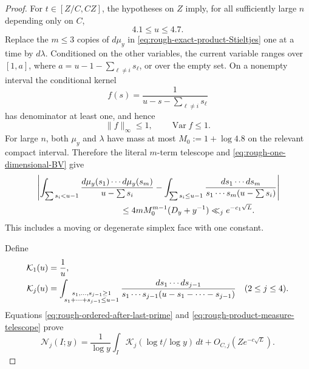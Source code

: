 \documentclass[11pt]{article}
\numberwithin{equation}{section}
\theoremstyle{definition}
\theoremstyle{remark}
\newcommand{\1}{\mathbf 1}
\begin{document}
\begin{proof}
For \(t\in[Z/C,CZ]\), the hypotheses on \(Z\) imply, for all sufficiently
large \(n\) depending only on \(C\),
\begin{equation}
                         4.1\le u\le4.7.
 \label{eq:rough-padded-u-range}
\end{equation}
Replace the \(m\le3\) copies of \(d\mu_y\) in
\eqref{eq:rough-exact-product-Stieltjes} one at a time by \(d\lambda\).
Conditioned on the other variables, the current variable ranges over
\([1,a]\), where
\(
 a=u-1-\sum_{\ell\ne i}s_\ell
\), or over the empty set.  On a nonempty interval the conditional
kernel
\[
 f(s)=\frac1{u-s-\sum_{\ell\ne i}s_\ell}
\]
has denominator at least one, and hence
\begin{equation}
 \|f\|_\infty\le1,\qquad \operatorname{Var}f\le1.
 \label{eq:rough-conditional-BV}
\end{equation}
For large \(n\), both \(\mu_y\) and \(\lambda\) have mass at most
\(M_0:=1+\log4.8\) on the relevant compact interval.  Therefore the
literal \(m\)-term telescope and
\eqref{eq:rough-one-dimensional-BV} give
\begin{align}
 &\left|
 \int_{\sum s_i<u-1}
       \frac{d\mu_y(s_1)\cdots d\mu_y(s_m)}{u-\sum s_i}
 -\int_{\sum s_i\le u-1}
       \frac{ds_1\cdots ds_m}
        {s_1\cdots s_m(u-\sum s_i)}
 \right|\notag\\
 &\hspace{35mm}
 \le4mM_0^{m-1}(D_y+y^{-1})
 \ll_j e^{-c_1\sqrt L}.
 \label{eq:rough-product-measure-telescope}
\end{align}
This includes a moving or degenerate simplex face with one constant.

Define
\begin{align}
 \mathcal K_1(u)&=\frac1u,\notag\\
 \mathcal K_j(u)&=
 \int_{\substack{s_1,\ldots,s_{j-1}\ge1\\
                  s_1+\cdots+s_{j-1}\le u-1}}
 \frac{ds_1\cdots ds_{j-1}}
 {s_1\cdots s_{j-1}(u-s_1-\cdots-s_{j-1})}
 \quad(2\le j\le4).
 \label{eq:exceptional-Kj}
\end{align}
Equations \eqref{eq:rough-ordered-after-last-prime} and
\eqref{eq:rough-product-measure-telescope} prove
\begin{equation}
 \mathcal N_j(I;y)
 =\frac1{\log y}\int_I
       \mathcal K_j(\log t/\log y)\,dt
   +O_{C,j}(Ze^{-c\sqrt L}).
 \label{eq:rough-ordered-asymptotic}
\end{equation}


\end{proof}
\end{document}
